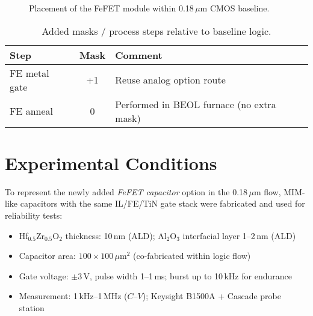 \documentclass[journal]{IEEEtran}
\begin{document}
\begin{figure}[!t]
\centering
{}
\caption{Placement of the FeFET module within 0.18\,$\mu$m CMOS baseline.}
\label{fig:flow}
\end{figure}

\FloatBarrier

\begin{table}[!t]
  \centering
  \caption{Added masks / process steps relative to baseline logic.}
  \label{tab:masks}
  \begin{tabular}{@{}lcl@{}}
    \toprule
    Step & Mask & Comment\\
    \midrule
    FE metal gate & +1 & Reuse analog option route\\
    FE anneal     & 0  & Performed in BEOL furnace (no extra mask)\\
    \bottomrule
  \end{tabular}
\end{table}

\section{Experimental Conditions}
To represent the newly added \emph{FeFET capacitor} option in the 0.18\,$\mu$m flow, MIM-like capacitors with the same IL/FE/TiN gate stack were fabricated and used for reliability tests:
\begin{itemize}
  \item Hf$_{0.5}$Zr$_{0.5}$O$_2$ thickness: 10\,nm (ALD); Al$_2$O$_3$ interfacial layer 1--2\,nm (ALD)
  \item Capacitor area: $100 \times 100\,\mu$m$^2$ (co-fabricated within logic flow)
  \item Gate voltage: $\pm 3$\,V, pulse width 1--1\,ms; burst up to 10\,kHz for endurance
  \item Measurement: 1\,kHz--1\,MHz ($C$--$V$); Keysight B1500A + Cascade probe station
\end{itemize}
\end{document}
